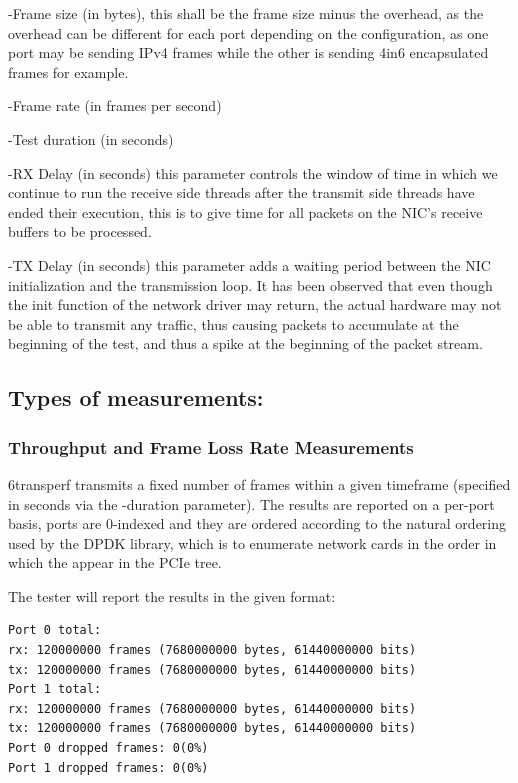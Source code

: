 \documentclass[a4paper,12p]{article}
\begin{document}
-Frame size (in bytes), this shall be the frame size minus the overhead, as the overhead can be different for each port depending on the configuration, as one port may be sending IPv4 frames while the other is sending 4in6 encapsulated frames for example.

-Frame rate (in frames per second)

-Test duration (in seconds)

-RX Delay (in seconds) this parameter controls the window of time in which we continue to run the receive side threads after the transmit side threads have ended their execution, this is to give time for all packets on the NIC’s receive buffers to be processed.

-TX Delay (in seconds) this parameter adds a waiting period between the NIC initialization and the transmission loop. It has been observed that even though the init function of the network driver may return, the actual hardware may not be able to transmit any traffic, thus causing packets to accumulate at the beginning of the test, and thus a spike at the beginning of the packet stream.

\subsection{Types of measurements:}
\subsubsection{Throughput and Frame Loss Rate Measurements}

6transperf transmits a fixed number of frames within a given timeframe (specified in seconds via the -duration parameter). The results are reported on a per-port basis, ports are 0-indexed and they are ordered according to the natural ordering used by the DPDK library, which is to enumerate network cards in the order in which the appear in the PCIe tree.

The tester will report the results in the given format:

\begin{lstlisting}
Port 0 total:
rx: 120000000 frames (7680000000 bytes, 61440000000 bits)
tx: 120000000 frames (7680000000 bytes, 61440000000 bits)
Port 1 total:
rx: 120000000 frames (7680000000 bytes, 61440000000 bits)
tx: 120000000 frames (7680000000 bytes, 61440000000 bits)
Port 0 dropped frames: 0(0%)
Port 1 dropped frames: 0(0%)
\end{lstlisting}
\end{document}
